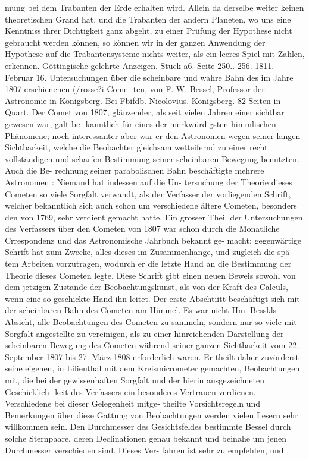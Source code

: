 \documentclass[12pt,a4paper]{article}
\begin{document}
mung  bei  dem  Trabanten  der  Erde  erhalten  wird.  Allein  da  derselbe  weiter  keinen  theoretischen  Grand hat,  und  die  Trabanten  der  andern  Planeten,  wo  uns  eine  Kenntniss  ihrer  Dichtigkeit  ganz  abgeht,  zu einer  Prüfung  der  Hypothese  nicht  gebraucht  werden  können,  so  können  wir  in  der  ganzen  Anwendung der  Hypothese  auf  die  Trabantensysteme  nichts  weiter,  als  ein  leeres  Spiel  mit  Zahlen,  erkennen. Göttingische  gelehrte  Anzeigen.     Stück  a6.     Seite  250.. 256.     1811.  Februar  16. Untersuchungen  über  die  scheinbare  und  wahre  Bahn  des  im  Jahre  1807  erschienenen  (/rosse?i  Come- ten,  von  F.  W.  Bessel,  Professor  der  Astronomie  in  Königsberg.  Bei  Fbifdb.  Nicolovius.  Königsberg. 82  Seiten  in  Quart. Der  Comet  von  1807,  glänzender,  als  seit  vielen  Jahren  einer  sichtbar  gewesen  war,  galt  be- kanntlich für  eines  der  merkwürdigsten  himmlischen  Phänomene;  noch  interessanter  aber  war  er  den Astronomen  wegen  seiner  langen  Sichtbarkeit,  welche  die  Beobachter  gleichsam  wetteifernd  zu  einer recht  vollständigen  und  scharfen  Bestimmung  seiner  scheinbaren  Bewegung  benutzten.  Auch  die  Be- rechnung seiner  parabolischen  Bahn  beschäftigte  mehrere  Astronomen :  Niemand  hat  indessen  auf  die  Un- tersuchung der  Theorie  dieses  Cometen  so  viele  Sorgfalt  verwandt,  als  der  Verfasser  der  vorliegenden Schrift,  welcher  bekanntlich  sich  auch  schon  um  verschiedene  ältere  Cometen,  besonders  den  von  1769, sehr  verdient  gemacht  hatte.  Ein  grosser  Theil  der  Untersuchungen  des  Verfassers  über  den  Cometen von  1807  war  schon  durch  die  Monatliche  Crrespondenz  und  das  Astronomische  Jahrbuch  bekannt  ge- macht; gegenwärtige  Schrift  hat  zum  Zwecke,  alles  dieses  im  Zusammenhange,  und  zugleich  die  spä- tem Arbeiten  vorzutragen,  wodurch  er  die  letzte  Hand  an  die  Bestimmung  der  Theorie  dieses  Cometen legte.  Diese  Schrift  gibt  einen  neuen  Beweis  sowohl  von  dem  jetzigen  Zustande  der  Beobachtungskunst, als  von  der  Kraft  des  Calculs,  wenn  eine  so  geschickte  Hand  ihn  leitet. Der  erste  Abschtiitt  beschäftigt  sich  mit  der  scheinbaren  Bahn  des  Cometen  am  Himmel.  Es  war nicht  Hm.  Besskls  Absicht,  alle  Beobachtungen  des  Cometen  zu  sammeln,  sondern  nur  so  viele  mit Sorgfalt  angestellte  zu  vereinigen,  als  zu  einer  hinreichenden  Darstellung  der  scheinbaren  Bewegung des  Cometen  während  seiner  ganzen  Sichtbarkeit  vom  22.  September  1807  bis  27.  März  1808  erforderlich waren.  Er  theilt  daher  zuvörderst  seine  eigenen,  in  Lilienthal  mit  dem  Kreismicrometer  gemachten, Beobachtungen  mit,  die  bei  der  gewissenhaften  Sorgfalt  und  der  hierin  ausgezeichneten  Geschicklich- keit des  Verfassers  ein  besonderes  Vertrauen  verdienen.  Verschiedene  bei  dieser  Gelegenheit  mitge- theilte  Vorsichtsregeln  und  Bemerkungen  über  diese  Gattung  von  Beobachtungen  werden  vielen  Lesern sehr  willkommen  sein.  Den  Durchmesser  des  Gesichtsfeldes  bestimmte  Bessel  durch  solche  Sternpaare, deren  Declinationen  genau  bekannt  und  beinahe  um  jenen  Durchmesser  verschieden  sind.  Dieses  Ver- fahren ist  sehr  zu  empfehlen,  und 
\end{document}

